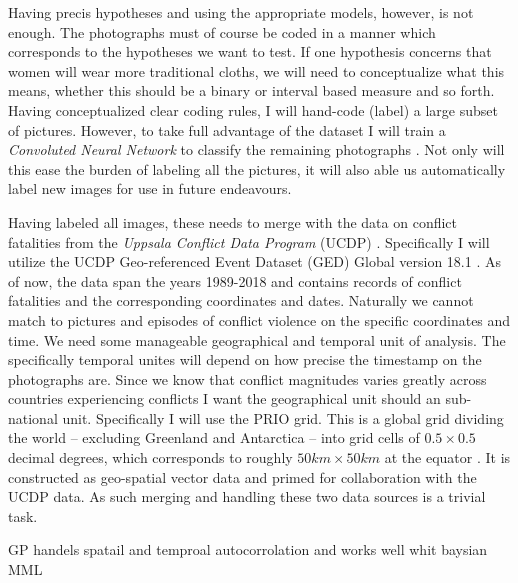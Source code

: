 \documentclass[a4paper]{article}
\begin{document}
Having precis hypotheses and using the appropriate models, however, is not enough. The photographs must of course be coded in a manner which corresponds to the hypotheses we want to test. If one hypothesis concerns that women will wear more traditional cloths, we will need to conceptualize what this means, whether this should be a binary or interval based measure and so forth. Having conceptualized clear coding rules, I will hand-code (label) a large subset of pictures. However, to take full advantage of the dataset I will train a \emph{Convoluted Neural Network} to classify the remaining photographs \cite[XX]{francois2017deep}. Not only will this ease the burden of labeling all the pictures, it will also able us automatically label new images for use in future endeavours.\par    
Having labeled all images, these needs to merge with the data on conflict fatalities from  the \emph{Uppsala Conflict Data Program} (UCDP) \citep{Sundberg_2013, Croicu_Sundberg_2017}. Specifically I will utilize the UCDP Geo-referenced Event Dataset (GED) Global version 18.1 \citep{UCDP_2017}. As of now, the data span the years 1989-2018 and contains records of conflict fatalities and the corresponding coordinates and dates. Naturally we cannot match to pictures and episodes of conflict violence on the specific coordinates and time. We need some manageable geographical and temporal unit of analysis. The specifically temporal unites will depend on how precise the timestamp on the photographs are. Since we know that conflict magnitudes varies greatly across countries experiencing conflicts I want the geographical unit should an sub-national unit. Specifically I will use the PRIO grid. This is a global grid dividing the world -- excluding Greenland and Antarctica -- into grid cells of $0.5 \times 0.5$ decimal degrees, which corresponds to roughly $50km\times50km$ at the equator \citep[367]{Tollefsen_2012}. It is constructed as geo-spatial vector data and primed for collaboration with the UCDP data. As such merging and handling these two data sources is a trivial task.\par

GP handels spatail and temproal autocorrolation and works well whit baysian MML


\end{document}
